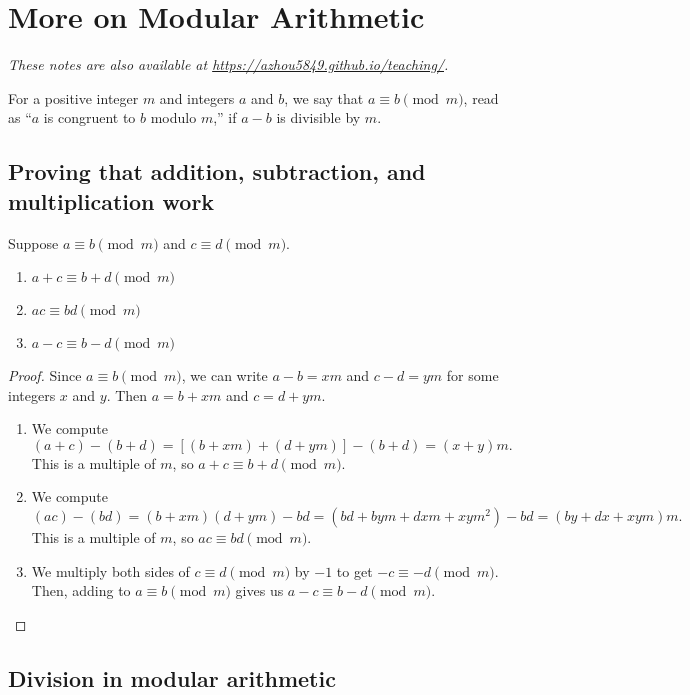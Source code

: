 \section{More on Modular Arithmetic}

\textit{These notes are also available at \url{https://azhou5849.github.io/teaching/}.}

For a positive integer $m$ and integers $a$ and $b$, we say that $a\equiv b\pmod{m}$, read as ``$a$ is congruent to $b$ modulo $m$,'' if $a - b$ is divisible by $m$.

\subsection{Proving that addition, subtraction, and multiplication work}

\begin{proposition}
Suppose $a\equiv b\pmod{m}$ and $c\equiv d\pmod{m}$.
\begin{enumerate}
\item $a + c\equiv b + d\pmod{m}$
\item $ac\equiv bd\pmod{m}$
\item $a - c\equiv b - d\pmod{m}$
\end{enumerate}
\end{proposition}
\begin{proof}
Since $a\equiv b\pmod{m}$, we can write $a - b = xm$ and $c - d = ym$ for some integers $x$ and $y$. Then $a = b + xm$ and $c = d + ym$.
\begin{enumerate}
\item We compute
\begin{equation*}
(a + c) - (b + d) = [(b + xm) + (d + ym)] - (b + d) = (x + y)m.
\end{equation*}
This is a multiple of $m$, so $a + c\equiv b + d\pmod{m}$.
\item We compute 
\begin{equation*}
(ac) - (bd) = (b + xm)(d + ym) - bd = (bd + bym + dxm + xym^2) - bd = (by + dx + xym)m.
\end{equation*}
This is a multiple of $m$, so $ac\equiv bd\pmod{m}$.
\item We multiply both sides of $c\equiv d\pmod{m}$ by $-1$ to get $-c\equiv -d\pmod{m}$. Then, adding to $a\equiv b\pmod{m}$ gives us $a - c\equiv b - d\pmod{m}$.
\end{enumerate}
\end{proof}


\subsection{Division in modular arithmetic}

